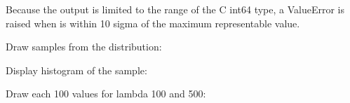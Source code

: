 \documentclass[letterpaper,10pt,english]{sphinxmanual}
\begin{document}
\begin{fulllineitems}
Because the output is limited to the range of the C int64 type, a
ValueError is raised when  is within 10 sigma of the maximum
representable value.

Draw samples from the distribution:

\begin{sphinxVerbatim}[commandchars=\\\{\}]
   
   
\end{sphinxVerbatim}

Display histogram of the sample:

\begin{sphinxVerbatim}[commandchars=\\\{\}]
   
      
\end{sphinxVerbatim}

Draw each 100 values for lambda 100 and 500:

\begin{sphinxVerbatim}[commandchars=\\\{\}]
     
\end{sphinxVerbatim}

\end{fulllineitems}

\end{document}
